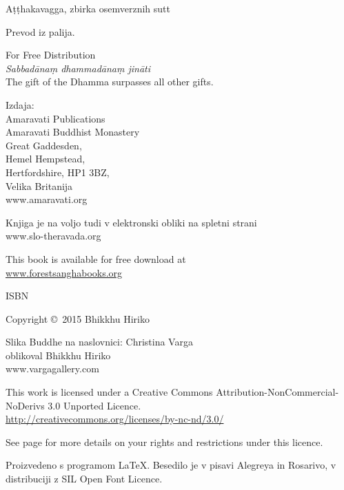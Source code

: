 \cleartoverso

\thispagestyle{empty}

{\smaller\setlength{\parskip}{0.5em}\setlength{\parindent}{0em}%
{\raggedright

Aṭṭhakavagga, zbirka osemverznih sutt

Prevod iz palija.

For Free Distribution\\
\emph{Sabbadānaṃ dhammadānaṃ jināti}\\
The gift of the Dhamma surpasses all other gifts.

Izdaja:\\
Amaravati Publications\\
Amaravati Buddhist Monastery\\
Great Gaddesden,\\
Hemel Hempstead,\\
Hertfordshire, HP1 3BZ,\\
Velika Britanija\\
www.amaravati.org

Knjiga je na voljo tudi v elektronski obliki na spletni strani\\
www.slo-theravada.org

This book is available for free download at\\
\href{http://forestsanghabooks.org/}{www.forestsanghabooks.org}

ISBN \theISBN

Copyright \copyright\ 2015 Bhikkhu Hiriko

Slika Buddhe na naslovnici: Christina Varga\\
oblikoval Bhikkhu Hiriko\\
www.vargagallery.com

\vfill

This work is licensed under a Creative Commons Attribution-NonCommercial-NoDerivs 3.0 Unported Licence.\\
\href{http://creativecommons.org/licenses/by-nc-nd/3.0/}{http://creativecommons.org/licenses/by-nc-nd/3.0/}

See page \pageref{copyright-details} for more details on your rights and restrictions under this licence.

Proizvedeno s programom {\selectfont\LaTeX}. Besedilo je v pisavi Alegreya in Rosarivo, v distribuciji z SIL Open Font Licence.

\theEditionInfo

\thePrintedByInfo

}}


